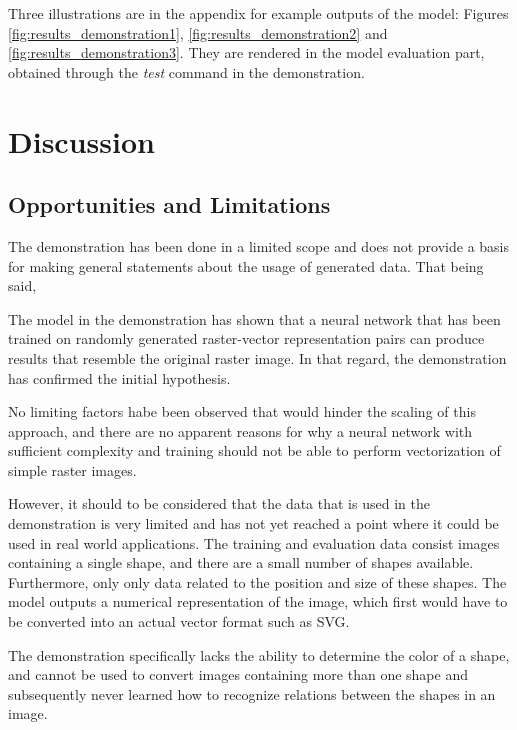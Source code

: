 \documentclass[12pt, a4paper, titlepage]{report}
\begin{document}
Three illustrations are in the appendix for example outputs of the model: Figures \ref{fig:results_demonstration1}, \ref{fig:results_demonstration2} and \ref{fig:results_demonstration3}.
They are rendered in the model evaluation part, obtained through the \emph{test} command in the demonstration.





\chapter{Discussion}

\section{Opportunities and Limitations}

The demonstration has been done in a limited scope and does not provide a basis for making general statements about the usage of generated data. That being said, 

The model in the demonstration has shown that a neural network that has been trained on randomly generated raster-vector representation pairs can produce results that resemble the original raster image. In that regard, the demonstration has confirmed the initial hypothesis.

No limiting factors habe been observed that would hinder the scaling of this approach, and there are no apparent reasons for why a neural network with sufficient complexity and training should not be able to perform vectorization of simple raster images.


However, it should to be considered that the data that is used in the demonstration is very limited and has not yet reached a point where it could be used in real world applications. The training and evaluation data consist images containing a single shape, and there are a small number of shapes available. Furthermore, only only data related to the position and size of these shapes. The model outputs a numerical representation of the image, which first would have to be converted into an actual vector format such as SVG.

The demonstration specifically lacks the ability to determine the color of a shape, and cannot be used to convert images containing more than one shape and subsequently never learned how to recognize relations between the shapes in an image.
\end{document}
